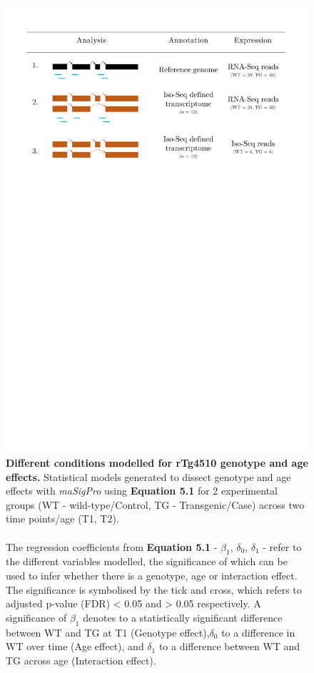 \begin{figure}[!htp]
	\centering
	\includegraphics[page=2,trim={0 5cm 0 4cm},scale = 0.45]{Figures/Tg4510_diff_figures.pdf}
	\captionsetup{width=0.95\textwidth}
	\caption[Different conditions modelled for rTg4510 genotype and age effects]%
	{\textbf{Different conditions modelled for rTg4510 genotype and age effects.} Statistical models generated to dissect genotype and age effects with \textit{maSigPro} using \textbf{Equation 5.1} for 2 experimental groups (WT - wild-type/Control, TG - Transgenic/Case) across two time points/age (T1, T2). 
	\\\\
	The regression coefficients from \textbf{Equation 5.1} - $\beta_{1}$, $\delta_{0}$, $\delta_{1}$ - refer to the different variables modelled, the significance of which can be used to infer whether there is a genotype, age or interaction effect. The significance is symbolised by the tick and cross, which refers to adjusted p-value (FDR) < 0.05 and > 0.05 respectively. A significance of  $\beta_{1}$ denotes to a statistically significant difference between WT and TG at T1 (Genotype effect),$\delta_{0}$ to a difference in WT over time (Age effect), and $\delta_{1}$ to a difference between WT and TG across age (Interaction effect).}   
	\label{fig:dea_model}
\end{figure}

